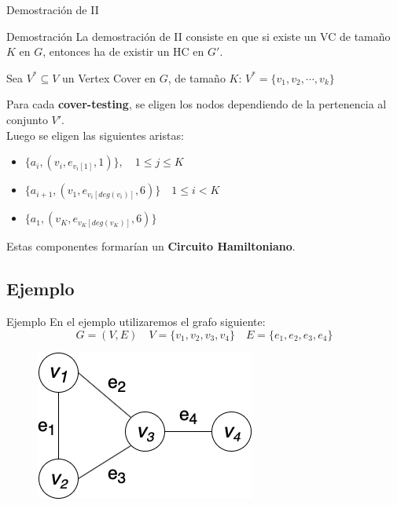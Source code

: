 \documentclass{beamer}
\begin{document}
\begin{frame}{Demostración de II}
    \begin{block}{Demostración}
        La demostración de II consiste en que si existe un VC de tamaño $K$ en $G$,
        entonces ha de existir un HC en $G'$.
    \end{block}
    Sea $V^* \subseteq V$ un Vertex Cover en $G$, de tamaño $K$: $V^* = \{v_1,v_2, \cdots, v_k \}$\\
    \begin{block}{}
        Para cada \textbf{cover-testing}, se eligen los nodos dependiendo de la pertenencia al conjunto $V'$.\\
        Luego se eligen las siguientes aristas:
        \begin{itemize}
            \item $\{a_i, (v_i, e_{v_i[1]}, 1)\}, \quad 1 \le j \le K$
            \item $\{a_{i+1}, (v_1, e_{v_i[deg(v_i)]}, 6)\} \quad 1 \le i < K$
            \item $\{a_1, (v_K, e_{v_K[deg(v_K)]}, 6)\}$
        \end{itemize}
    \end{block}
    \begin{block}{}
        \begin{center}
            Estas componentes formarían un \textbf{Circuito Hamiltoniano}.
        \end{center}
    \end{block}
\end{frame}

\subsection{Ejemplo}
\begin{frame}{Ejemplo}
    En el ejemplo utilizaremos el grafo siguiente:
    \[G = (V, E) \quad V = \{v_1, v_2, v_3, v_4\} \quad E = \{e_1, e_2, e_3, e_4\}\]
    \begin{figure}
        \centering
        \includegraphics[scale=0.6]{images/example-1.png}
        \label{fig:my_label}
    \end{figure}
\end{frame}
\end{document}
